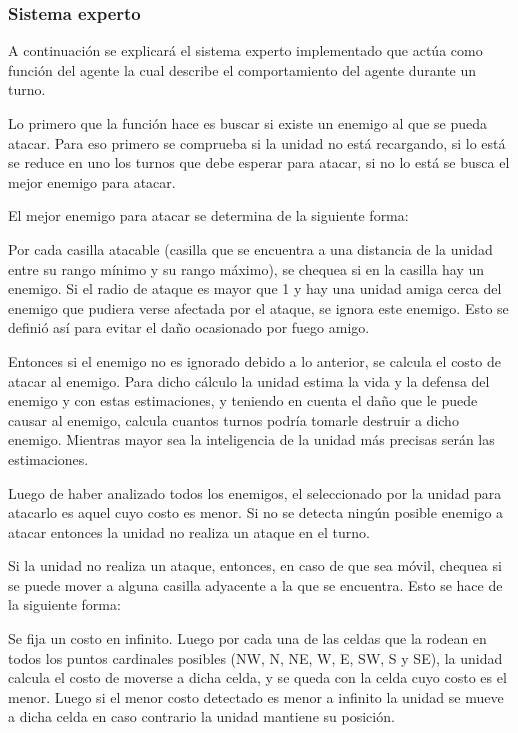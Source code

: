 \subsubsection{Sistema experto}

A continuación se explicará el sistema experto implementado que actúa como función del agente la cual describe el comportamiento del agente durante un turno.

Lo primero que la función hace es buscar si existe un enemigo al que se pueda atacar. Para eso primero se comprueba si la unidad no está recargando, si lo está se reduce en uno los turnos que debe esperar para atacar, si no lo está se busca el mejor enemigo para atacar. 
 
El mejor enemigo para atacar se determina de la siguiente forma:
 
Por cada casilla atacable (casilla que se encuentra a una distancia de la unidad entre su rango mínimo y su rango máximo), se chequea si en la casilla hay un enemigo. Si el radio de ataque es mayor que 1 y hay una unidad amiga cerca del enemigo que pudiera verse afectada por el ataque, se ignora este enemigo. Esto se definió así para evitar el daño ocasionado por fuego amigo.
 
Entonces si el enemigo no es ignorado debido a lo anterior, se calcula el costo de atacar al enemigo. Para dicho cálculo la unidad estima la vida y la defensa del enemigo y con estas estimaciones, y teniendo en cuenta el da\~{n}o que le puede causar al enemigo, calcula cuantos turnos podría tomarle destruir a dicho enemigo. Mientras mayor sea la inteligencia de la unidad más precisas serán las estimaciones.

Luego de haber analizado todos los enemigos, el seleccionado por la unidad para atacarlo es aquel cuyo costo es menor. Si no se detecta ningún posible enemigo a atacar entonces la unidad no realiza un ataque en el turno.
 
Si la unidad no realiza un ataque, entonces, en caso de que sea móvil, chequea si se puede mover a alguna casilla adyacente a la que se encuentra. Esto se hace de la siguiente forma:
 
Se fija un costo en infinito. Luego por cada una de las celdas que la rodean en todos los puntos cardinales posibles (NW, N, NE, W, E, SW, S y SE), la unidad calcula el costo de moverse a dicha celda, y se queda con la celda cuyo costo es el menor. Luego si el menor costo detectado es menor a infinito la unidad se mueve a dicha celda en caso contrario la unidad mantiene su posición. 
 
